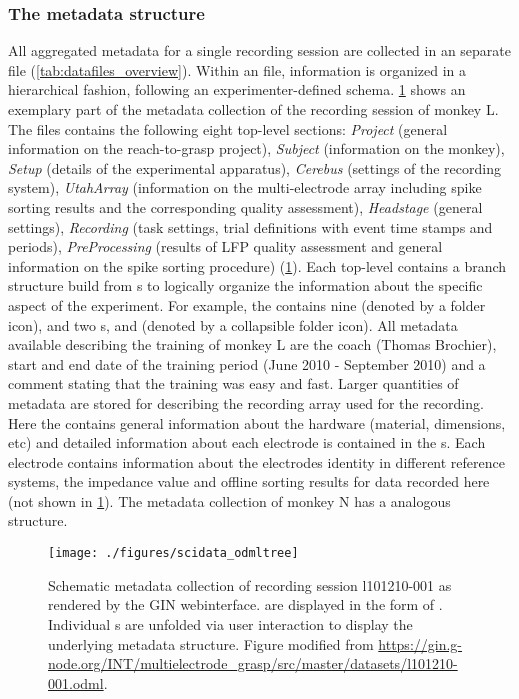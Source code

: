 \subsubsection{The metadata structure}
\label{sec:scidata_metadata_structure}
All aggregated metadata for a single recording session are collected in an separate  file (\ref{tab:datafiles_overview}). Within an  file, information is organized in a hierarchical fashion, following an experimenter-defined schema. \cref{fig:scidata_l101210odml} shows an exemplary part of the metadata collection of the recording session of monkey L. The  files contains the following eight top-level sections: \textit{Project} (general information on the reach-to-grasp project), \textit{Subject} (information on the monkey), \textit{Setup} (details of the experimental apparatus), \textit{Cerebus} (settings of the recording system), \textit{UtahArray} (information on the multi-electrode array including spike sorting results and the corresponding quality assessment), \textit{Headstage} (general settings), \textit{Recording} (task settings, trial definitions with event time stamps and periods), \textit{PreProcessing} (results of LFP quality assessment and general information on the spike sorting procedure) (\cref{fig:scidata_l101210odml}). Each top-level  contains a branch structure build from s to logically organize the information about the specific aspect of the experiment. For example, the   contains nine  (denoted by a folder icon), and two s,  and  (denoted by a collapsible folder icon). All metadata available describing the training of monkey L are the coach (Thomas Brochier), start and end date of the training period (June 2010 - September 2010) and a comment stating that the training was easy and fast. Larger quantities of metadata are stored for describing the recording array used for the recording. Here the   contains general information about the hardware (material, dimensions, etc) and detailed information about each electrode is contained in the  s. Each electrode  contains information about the electrodes identity in different reference systems, the impedance value and offline sorting results for data recorded here (not shown in \cref{fig:scidata_l101210odml}). The metadata collection of monkey N has a analogous structure.

\begin{figure}
 \texttt{[image: ./figures/scidata\_odmltree]}
 \caption[Schematic metadata collection of session l101210-001]{Schematic metadata collection of recording session l101210-001 as rendered by the GIN webinterface.  are displayed in the form of . Individual s are unfolded via user interaction to display the underlying metadata structure. Figure modified from \url{https://gin.g-node.org/INT/multielectrode_grasp/src/master/datasets/l101210-001.odml}.}
 \label{fig:scidata_l101210odml}
\end{figure}

